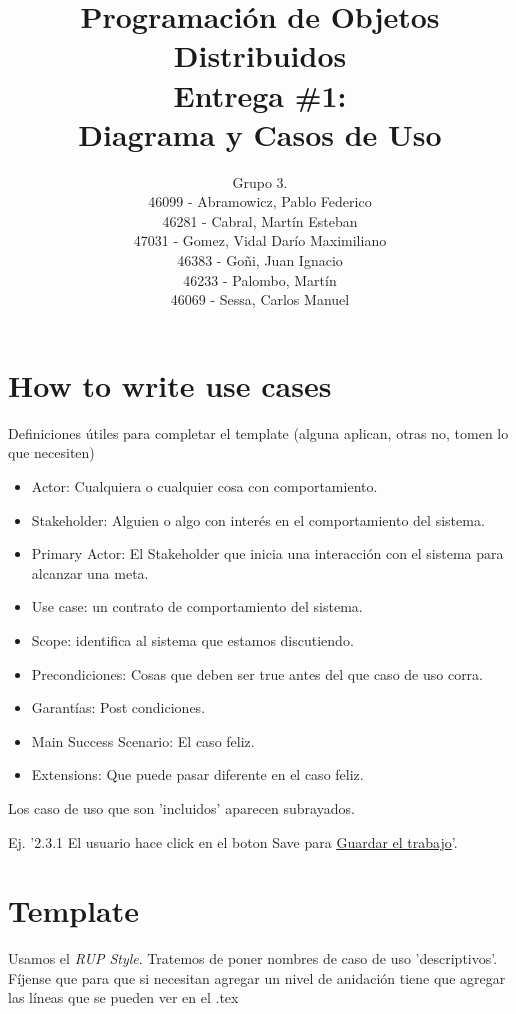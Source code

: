\documentclass[a4paper,11pt]{article}
\title{
        Programación de Objetos Distribuidos \\
        Entrega \#1: \\
        Diagrama y Casos de Uso
    }
\author{
        Grupo 3. \\
        46099 - Abramowicz, Pablo Federico \\
        46281 - Cabral, Martín Esteban \\
        47031 - Gomez, Vidal Darío Maximiliano \\
        46383 - Goñi, Juan Ignacio \\
        46233 - Palombo, Martín \\
        46069 - Sessa, Carlos Manuel
        }
\date{}
\begin{document}
\maketitle
\pagebreak
\section{How to write use cases}

Definiciones útiles para completar el template
(alguna aplican, otras no, tomen lo que necesiten)

\begin{itemize}
 \item Actor: Cualquiera o cualquier cosa con comportamiento.
 \item Stakeholder: Alguien o algo con interés en el comportamiento del sistema.
 \item Primary Actor: El Stakeholder que inicia una interacción con el sistema para alcanzar una meta.
 \item Use case: un contrato de comportamiento del sistema.
 \item Scope: identifica al sistema que estamos discutiendo.
 \item Precondiciones: Cosas que deben ser true antes del que caso de uso corra.
 \item Garantías: Post condiciones.
 \item Main Success Scenario: El caso feliz.
 \item Extensions: Que puede pasar diferente en el caso feliz.
\end{itemize}

Los caso de uso que son 'incluidos' aparecen subrayados.

Ej. '2.3.1 El usuario hace click en el boton Save para \underline{Guardar el trabajo}'.

\pagebreak
\section{Template}
Usamos el \emph{RUP Style}. Tratemos de poner nombres de caso de uso 'descriptivos'.
Fíjense que para que si necesitan agregar un nivel de anidación tiene que agregar
las líneas que se pueden ver en el .tex

\renewcommand{\theenumi}{\arabic{enumi}.}
\renewcommand{\labelenumi}{\theenumi}
 
\renewcommand{\theenumii}{\arabic{enumii}.}
\renewcommand{\labelenumii}{\theenumii}
\end{document}
